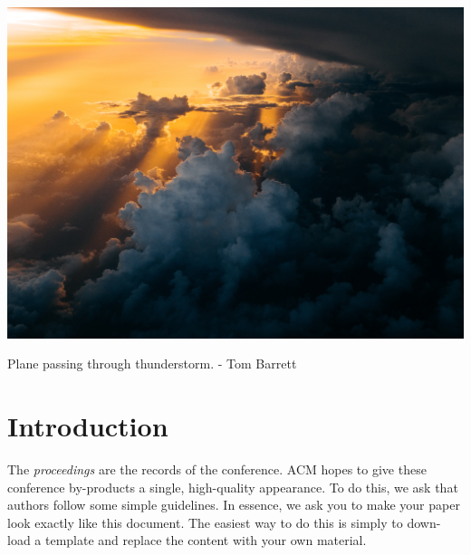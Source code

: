 \documentclass[acmtog, authorversion]{acmart}
\begin{document}



\begin{teaserfigure}
  \includegraphics*[width=\textwidth, trim= 0in 16.0in 0in 16.0in]{report/Bachelor's Student Conference Proceedings Paper in LaTeX Template/images/storm.jpg}
  \caption{Plane passing through thunderstorm. - Tom Barrett}
  \label{fig:teaser}
\end{teaserfigure}

\maketitle

\section{Introduction}
The \textit{proceedings} are the records of the conference. ACM 
hopes to give these conference by-products a single, high-quality
appearance. To do this, we ask that authors follow some simple 
guidelines. In essence, we ask you to make your paper look exactly 
like this document. The easiest way to do this is simply to down-load 
a template and replace the content with your own material.
\end{document}
